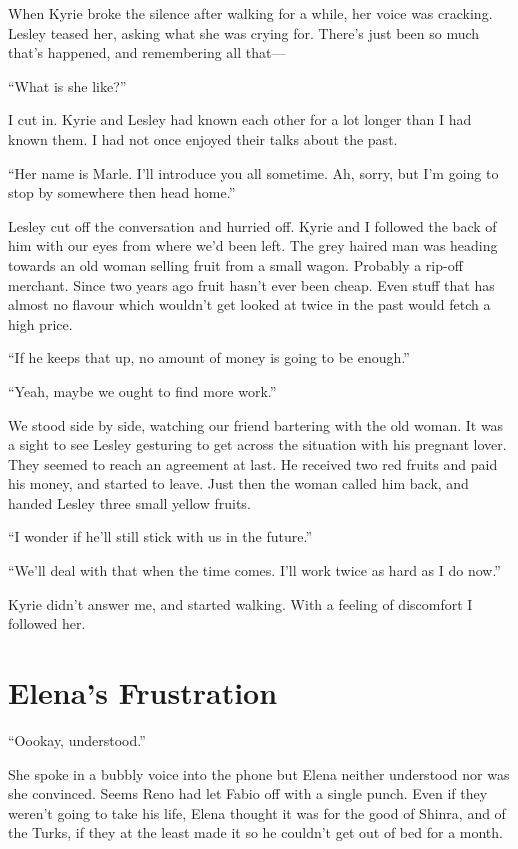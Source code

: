 \documentclass[oneside]{book}
\begin{document}
When Kyrie broke the silence after walking for a while, her voice was cracking. Lesley teased her, asking what she was crying for. There’s just been so much that’s happened, and remembering all that—

“What is she like?”

I cut in. Kyrie and Lesley had known each other for a lot longer than I had known them. I had not once enjoyed their talks about the past.

“Her name is Marle. I’ll introduce you all sometime. Ah, sorry, but I’m going to stop by somewhere then head home.”

Lesley cut off the conversation and hurried off. Kyrie and I followed the back of him with our eyes from where we’d been left. The grey haired man was heading towards an old woman selling fruit from a small wagon. Probably a rip-off merchant. Since two years ago fruit hasn’t ever been cheap. Even stuff that has almost no flavour which wouldn’t get looked at twice in the past would fetch a high price.

“If he keeps that up, no amount of money is going to be enough.”

“Yeah, maybe we ought to find more work.”

We stood side by side, watching our friend bartering with the old woman. It was a sight to see Lesley gesturing to get across the situation with his pregnant lover. They seemed to reach an agreement at last. He received two red fruits and paid his money, and started to leave. Just then the woman called him back, and handed Lesley three small yellow fruits.

“I wonder if he’ll still stick with us in the future.”

“We’ll deal with that when the time comes. I’ll work twice as hard as I do now.”

Kyrie didn’t answer me, and started walking. With a feeling of discomfort I followed her.

\chapter{Elena’s Frustration}
“Oookay, understood.”

She spoke in a bubbly voice into the phone but Elena neither understood nor was she convinced. Seems Reno had let Fabio off with a single punch. Even if they weren’t going to take his life, Elena thought it was for the good of Shinra, and of the Turks, if they at the least made it so he couldn’t get out of bed for a month.
\end{document}
